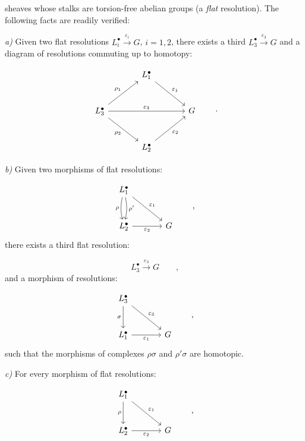 sheaves whose stalks are torsion-free abelian groups (a \emph{flat}
resolution). The following facts are readily verified:

\noindent\emph{a)} Given two flat resolutions
$L_i^{\bullet}\xrightarrow{\varepsilon_i}G$, $i=1,2$, there exists a third
$L_3^{\bullet}\xrightarrow{\varepsilon_3}G$ and a diagram of resolutions
commuting up to homotopy:

\[
\begin{tikzcd}[column sep=large,row sep=large]
  & L_1^{\bullet} \arrow[dr,"\varepsilon_1"] & \\
L_3^{\bullet} \arrow[ur,"\rho_1"] \arrow[rr,"\varepsilon_3"]
  \arrow[dr,"\rho_2"'] && G \\
  & L_2^{\bullet} \arrow[ur,"\varepsilon_2"'] &
\end{tikzcd}
\qquad\text{.}
\]

\noindent\emph{b)} Given two morphisms of flat resolutions:

\[
\begin{tikzcd}[column sep=large,row sep=large]
L_1^{\bullet}
  \arrow[d,bend right=12,"\rho"']
  \arrow[d,bend left=12,"\rho'"]
  \arrow[dr,"\varepsilon_1"] & \\
L_2^{\bullet} \arrow[r,"\varepsilon_2"'] & G
\end{tikzcd}
\qquad\text{,}
\]
there exists a third flat resolution:

\[
L_3^{\bullet}\xrightarrow{\varepsilon_3}G
\qquad\text{,}
\]
and a morphism of resolutions:

\[
\begin{tikzcd}[column sep=large,row sep=large]
L_3^{\bullet} \arrow[d,"\sigma"'] \arrow[dr,"\varepsilon_3"] & \\
L_1^{\bullet} \arrow[r,"\varepsilon_1"'] & G
\end{tikzcd}
\qquad\text{,}
\]
such that the morphisms of complexes $\rho\sigma$ and $\rho'\sigma$ are
homotopic.

\noindent\emph{c)} For every morphism of flat resolutions:

\[
\begin{tikzcd}[column sep=large,row sep=large]
L_1^{\bullet} \arrow[d,"\rho"'] \arrow[dr,"\varepsilon_1"] & \\
L_2^{\bullet} \arrow[r,"\varepsilon_2"'] & G
\end{tikzcd}
\qquad\text{,}
\]
